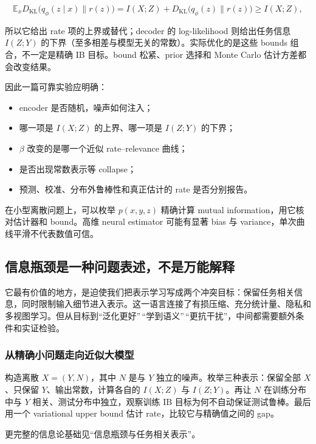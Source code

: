 \[
\mathbb E_x
D_{\mathrm{KL}}
\bigl(q_\phi(z\mid x)\|r(z)\bigr)
=I(X;Z)+D_{\mathrm{KL}}\bigl(q_\phi(z)\|r(z)\bigr)
\ge I(X;Z),
\]

所以它给出 rate 项的上界或替代；decoder 的 log-likelihood 则给出任务信息 \(I(Z;Y)\) 的下界（至多相差与模型无关的常数）。实际优化的是这些 bounds 组合，不一定是精确 IB 目标。bound 松紧、prior 选择和 Monte Carlo 估计方差都会改变结果。

因此一篇可靠实验应明确：

\begin{itemize}
\tightlist
\item
  encoder 是否随机，噪声如何注入；
\item
  哪一项是 \(I(X;Z)\) 的上界、哪一项是 \(I(Z;Y)\) 的下界；
\item
  \(\beta\) 改变的是哪一个近似 rate--relevance 曲线；
\item
  是否出现常数表示等 collapse；
\item
  预测、校准、分布外鲁棒性和真正估计的 rate 是否分别报告。
\end{itemize}

在小型离散问题上，可以枚举 \(p(x,y,z)\) 精确计算 mutual information，用它核对估计器和 bound。高维 neural estimator 可能有显著 bias 与 variance，单次曲线平滑不代表数值可信。

\subsection{信息瓶颈是一种问题表述，不是万能解释}

它最有价值的地方，是迫使我们把表示学习写成两个冲突目标：保留任务相关信息，同时限制输入细节进入表示。这一语言连接了有损压缩、充分统计量、隐私和多视图学习。但从目标到``泛化更好''\,``学到语义''\,``更抗干扰''，中间都需要额外条件和实证检验。

\subsubsection{从精确小问题走向近似大模型}

构造离散 \(X=(Y,N)\)，其中 \(N\) 是与 \(Y\) 独立的噪声。枚举三种表示：保留全部 \(X\)、只保留 \(Y\)、输出常数，计算各自的 \(I(X;Z)\) 与 \(I(Z;Y)\)。再让 \(N\) 在训练分布中与 \(Y\) 相关、测试分布中独立，观察训练 IB 目标为何不自动保证测试鲁棒。最后用一个 variational upper bound 估计 rate，比较它与精确值之间的 gap。

更完整的信息论基础见``信息瓶颈与任务相关表示''。
